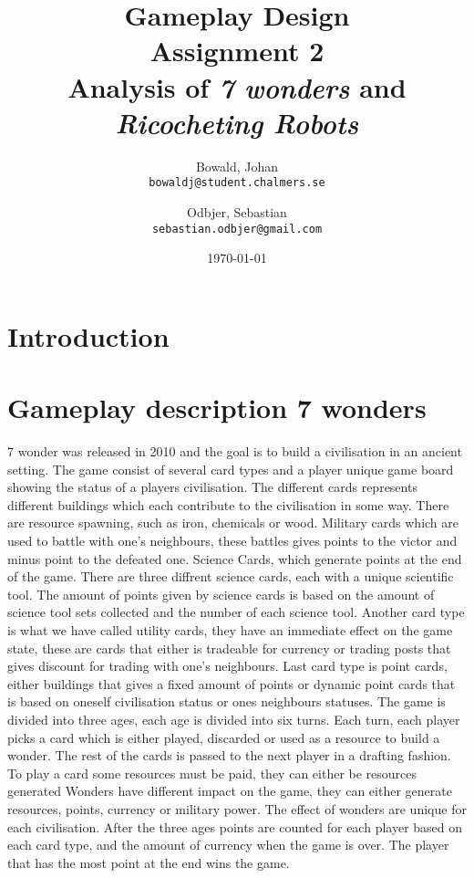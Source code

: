 \documentclass[a4paper]{article}
\title{Gameplay Design \\ Assignment 2 \\ Analysis of \textit{7 wonders} and \textit{Ricocheting Robots} }
\author{
  Bowald, Johan\\
  \texttt{bowaldj@student.chalmers.se}
  \and
  Odbjer, Sebastian\\
  \texttt{sebastian.odbjer@gmail.com}
}
\date{\today}
\begin{document}
\maketitle
\newpage
\tableofcontents{}
\newpage
\section{Introduction}

\section{Gameplay description 7 wonders}
\label{sec:what7wond}
7 wonder was released in 2010 and the goal is to build a civilisation in an ancient setting. 
The game consist of several card types and a player unique game board showing the status of a players civilisation. The different cards represents different buildings which each contribute to the civilisation in some way. There are resource spawning, such as iron, chemicals or wood. Military cards which are used to battle with one's neighbours, these battles gives points to the victor and minus point to the defeated one. Science Cards, which generate points at the end of the game. There are three diffrent science cards, each with a unique scientific tool. The amount of points given by science cards is based on the amount of science tool sets collected and the number of each science tool.
Another card type is what we have called utility cards, they have an immediate effect on the game state, these are cards that either is tradeable for currency or trading posts that gives discount for trading with one's neighbours. Last card type is point cards, either buildings that gives a fixed amount of points or dynamic point cards that is based on oneself civilisation status or ones neighbours statuses. The game is divided into three ages, each age is divided into six turns. Each turn, each player picks a card which is either played, discarded or used as a resource to build a wonder. The rest of the cards is passed to the next player in a drafting fashion. To play a card some resources must be paid, they can either be resources generated Wonders have different impact on the game, they can either generate resources, points, currency or military power. The effect of wonders are unique for each civilisation. After the three ages points are counted for each player based on each card type, and the amount of currency when the game is over. The player that has the most point at the end wins the game. 
\end{document}
